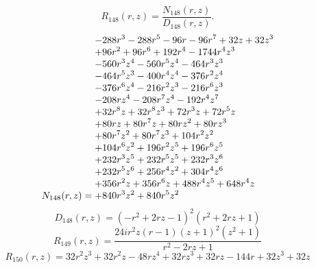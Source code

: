 \documentclass[11pt,a4paper]{article}
\begin{document}
\begin{equation}
R_{148}(r,z)=\frac{N_{148}(r,z)}{D_{148}(r,z)}.
\label{eq:cat-rational-148}
\end{equation}
\begin{equation}
N_{148}(r,z)=\shortstack[l]{$\displaystyle  - 288 r^{3} - 288 r^{5} - 96 r - 96 r^{7} + 32 z + 32 z^{3}$\\
$\displaystyle  + 96 r^{2} + 96 r^{6} + 192 r^{4} - 1744 r^{4} z^{3}$\\
$\displaystyle  - 560 r^{3} z^{4} - 560 r^{5} z^{4} - 464 r^{3} z^{3}$\\
$\displaystyle  - 464 r^{5} z^{3} - 400 r^{4} z^{4} - 376 r^{2} z^{4}$\\
$\displaystyle  - 376 r^{6} z^{4} - 216 r^{2} z^{3} - 216 r^{6} z^{3}$\\
$\displaystyle  - 208 r z^{4} - 208 r^{7} z^{4} - 192 r^{4} z^{7}$\\
$\displaystyle  + 32 r^{8} z + 32 r^{8} z^{3} + 72 r^{3} z + 72 r^{5} z$\\
$\displaystyle  + 80 r z + 80 r^{7} z + 80 r z^{2} + 80 r z^{3}$\\
$\displaystyle  + 80 r^{7} z^{2} + 80 r^{7} z^{3} + 104 r^{2} z^{2}$\\
$\displaystyle  + 104 r^{6} z^{2} + 196 r^{2} z^{5} + 196 r^{6} z^{5}$\\
$\displaystyle  + 232 r^{3} z^{5} + 232 r^{5} z^{5} + 232 r^{3} z^{6}$\\
$\displaystyle  + 232 r^{5} z^{6} + 256 r^{4} z^{2} + 304 r^{4} z^{6}$\\
$\displaystyle  + 356 r^{2} z + 356 r^{6} z + 488 r^{4} z^{5} + 648 r^{4} z$\\
$\displaystyle  + 840 r^{3} z^{2} + 840 r^{5} z^{2}$}
\label{eq:cat-numerator-148}
\end{equation}
\begin{equation}
D_{148}(r,z)=\left(- r^{2} + 2 r z - 1\right)^{2} \left(r^{2} + 2 r z + 1\right)
\label{eq:cat-denominator-148}
\end{equation}
\begin{equation}
R_{149}(r,z)=\frac{24 i r^{2} z \left(r - 1\right) \left(z + 1\right)^{2} \left(z^{2} + 1\right)}{r^{2} - 2 r z + 1}
\label{eq:cat-rational-149}
\end{equation}
\begin{equation}
R_{150}(r,z)=32 r^{2} z^{3} + 32 r^{2} z - 48 r z^{4} + 32 r z^{3} + 32 r z - 144 r + 32 z^{3} + 32 z
\label{eq:cat-rational-150}
\end{equation}
\end{document}
